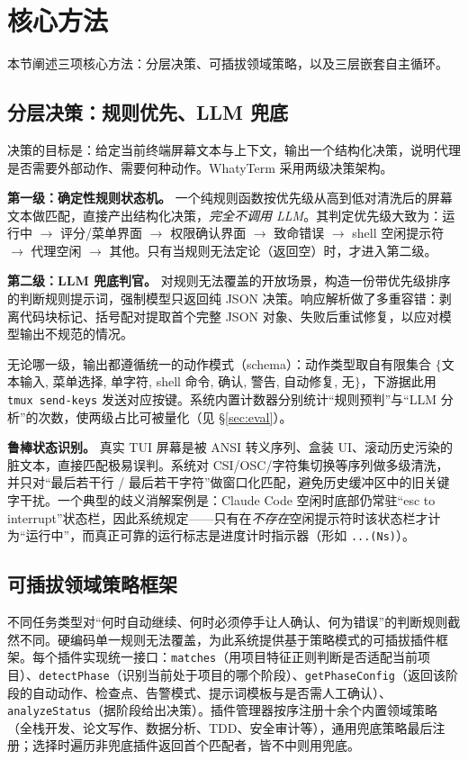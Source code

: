 \section{核心方法}
\label{sec:method}

本节阐述三项核心方法：分层决策、可插拔领域策略，以及三层嵌套自主循环。

\subsection{分层决策：规则优先、LLM 兜底}
\label{sec:method-decision}

决策的目标是：给定当前终端屏幕文本与上下文，输出一个结构化决策，说明代理是否需要外部动作、需要何种动作。WhatyTerm 采用两级决策架构。

\textbf{第一级：确定性规则状态机。} 一个纯规则函数按优先级从高到低对清洗后的屏幕文本做匹配，直接产出结构化决策，\emph{完全不调用 LLM}。其判定优先级大致为：运行中 $\to$ 评分/菜单界面 $\to$ 权限确认界面 $\to$ 致命错误 $\to$ shell 空闲提示符 $\to$ 代理空闲 $\to$ 其他。只有当规则无法定论（返回空）时，才进入第二级。

\textbf{第二级：LLM 兜底判官。} 对规则无法覆盖的开放场景，构造一份带优先级排序的判断规则提示词，强制模型只返回纯 JSON 决策。响应解析做了多重容错：剥离代码块标记、括号配对提取首个完整 JSON 对象、失败后重试修复，以应对模型输出不规范的情况。

无论哪一级，输出都遵循统一的动作模式（schema）：动作类型取自有限集合 $\{$文本输入, 菜单选择, 单字符, shell 命令, 确认, 警告, 自动修复, 无$\}$，下游据此用 \texttt{tmux send-keys} 发送对应按键。系统内置计数器分别统计“规则预判”与“LLM 分析”的次数，使两级占比可被量化（见 \S\ref{sec:eval}）。

\textbf{鲁棒状态识别。} 真实 TUI 屏幕是被 ANSI 转义序列、盒装 UI、滚动历史污染的脏文本，直接匹配极易误判。系统对 CSI/OSC/字符集切换等序列做多级清洗，并只对“最后若干行 / 最后若干字符”做窗口化匹配，避免历史缓冲区中的旧关键字干扰。一个典型的歧义消解案例是：Claude Code 空闲时底部仍常驻“esc to interrupt”状态栏，因此系统规定——只有在\emph{不存在}空闲提示符时该状态栏才计为“运行中”，而真正可靠的运行标志是进度计时指示器（形如 \texttt{...(Ns)}）。

\subsection{可插拔领域策略框架}
\label{sec:method-plugin}

不同任务类型对“何时自动继续、何时必须停手让人确认、何为错误”的判断规则截然不同。硬编码单一规则无法覆盖，为此系统提供基于策略模式的可插拔插件框架。每个插件实现统一接口：\texttt{matches}（用项目特征正则判断是否适配当前项目）、\texttt{detectPhase}（识别当前处于项目的哪个阶段）、\texttt{getPhaseConfig}（返回该阶段的自动动作、检查点、告警模式、提示词模板与是否需人工确认）、\texttt{analyzeStatus}（据阶段给出决策）。插件管理器按序注册十余个内置领域策略（全栈开发、论文写作、数据分析、TDD、安全审计等），通用兜底策略最后注册；选择时遍历非兜底插件返回首个匹配者，皆不中则用兜底。

